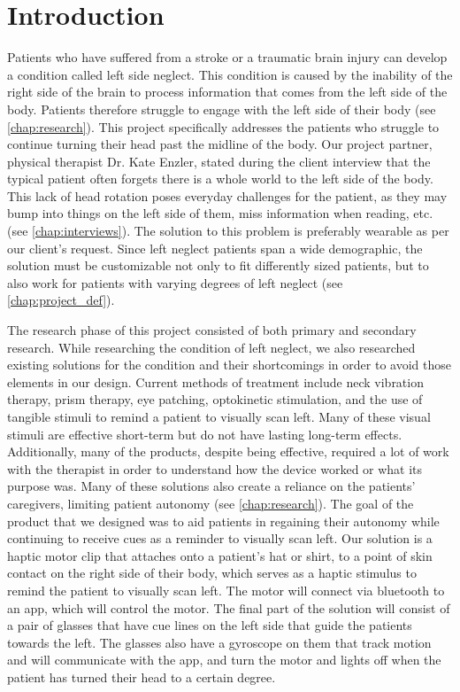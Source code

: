 \section{Introduction}

Patients who have suffered from a stroke or a traumatic brain injury can develop
a condition called left side neglect. This condition is caused by the inability
of the right side of the brain to process information that comes from the left
side of the body. Patients therefore struggle to engage with the left side of
their body (see \autoref{chap:research}). This project specifically
addresses the patients who struggle to continue turning their head past the
midline of the body. Our project partner, physical therapist Dr. Kate Enzler,
stated during the client interview that the typical patient often forgets there
is a whole world to the left side of the body. This lack of head rotation poses
everyday challenges for the patient, as they may bump into things on the left
side of them, miss information when reading, etc. (see
\autoref{chap:interviews}). The solution to this problem is preferably wearable
as per our client’s request. Since left neglect patients span a wide
demographic, the solution must be customizable not only to fit differently sized
patients, but to also work for patients with varying degrees of left neglect
(see \autoref{chap:project_def}).

The research phase of this project consisted of both primary and secondary
research. While researching the condition of left neglect, we also researched
existing solutions for the condition and their shortcomings in order to avoid
those elements in our design. Current methods of treatment include neck
vibration therapy, prism therapy, eye patching, optokinetic stimulation, and the
use of tangible stimuli to remind a patient to visually scan left. Many of these
visual stimuli are effective short-term but do not have lasting long-term
effects. Additionally, many of the products, despite being effective, required a
lot of work with the therapist in order to understand how the device worked or
what its purpose was. Many of these solutions also create a reliance on the
patients’ caregivers, limiting patient autonomy (see \autoref{chap:research}).
The goal of the product that we designed was to aid patients in
regaining their autonomy while continuing to receive cues as a reminder to
visually scan left.  Our solution is a haptic motor clip that attaches onto a
patient's hat or shirt, to a point of skin contact on the right side of their
body, which serves as a haptic stimulus to remind the patient to visually scan
left. The motor will connect via bluetooth to an app, which will control the
motor. The final part of the solution will consist of a pair of glasses that
have cue lines on the left side that guide the patients towards the left. The
glasses also have a gyroscope on them that track motion and will communicate
with the app, and turn the motor and lights off when the patient has turned
their head to a certain degree.

